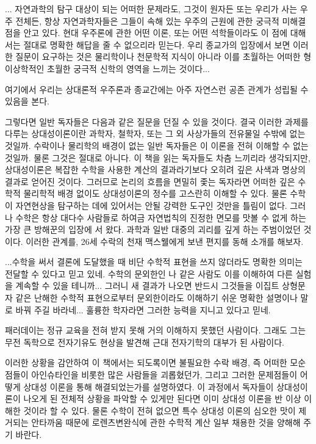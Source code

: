 \beginemph
... 자연과학의 탐구 대상이 되는 어떠한 문제라도, 그것이 원자든 또는 우리가 사는 우주
전체든, 항상 자연과학자들은 그들이 속해 있는 우주의 근원에 관한 궁극적 미해결 점을 안고
있다. 현대 우주론에 관한 어떤 이론, 또는 어떤 석학들이라도 이 점에 대해서는 절대로 명확한
해답을 줄 수 없으리라 믿는다. 우리 종교가의 입장에서 보면 이러한 질문이 요구하는 것은
물리학이나 천문학적 지식이 아니라 이를 초월하는 어떠한 형이상학적인 초월한 궁극적 신학의
영역을 느끼는 것이다...
\endemph

여기에서 우리는 상대론적 우주론과 종교간에는 아주 자연스런 공존 관계가 성립될 수 있음을
본다.

그렇다면 일반 독자들은 다음과 같은 질문을 던질 수 있을 것이다. 결국 이러한 과제를 다루는
상대성이론이란 과학자, 철학자, 또는 그 외 사상가들의 전유물일 수밖에 없는 것일까. 수락이나
물리학의 배경이 없는 일반 독자들은 이 이론을 전혀 이해할 수 없는 것일까. 물론 그것은
절대로 아니다. 이 책을 읽는 독자들도 차츰 느끼리라 생각되지만, 상대성이론은 복잡한 수학을
사용한 계산의 결과라기보다 오히려 깊은 사색과 명상의 결과로 얻어진 것이다. 그러므로
논리의 흐름을 면밀히 좇는 독자라면 어떠한 깊은 수학적 물리학적 배경 없이도 상대성이론의
정수를 고스란히 이해할 수 있다. 물론 수학이 자연현상을 탐구하는 데에 있어서는 안될 강력한
도구인 것만을 틀림이 없다. 그러나 수학은 항상 대다수 사람들로 하여금 자연법칙의 진정한
면모를 맛볼 수 없게 하는 가장 큰 방해꾼의 입장에 서 왔다. 과학과 일반 대중의 괴리를 깊게
하는 주범이었던 것이다. 이러한 관계를, 26세 수락의 천재 맥스웰에게 보낸 편지를 동해 소개를
해보자.

\beginemph
...수학을 써서 결론에 도달했을 때 비단 수학적 표현을 쓰지 않더라도 명확한 의미는 전달할
수 있다고 믿고 있네. 수학의 문외한인 나 같은 사람도 이를 이해하여 다른 실험을 계속할 수
있을 테니까... 그러니 새 결과가 나오면 반드시 그것들을 이집트 상형문자 같은 난해한 수학적
표현으로부터 문외한이라도 이해하기 쉬운 명확한 설명이나 말로 바꿔 주길 바라네... 훌륭한
학자라면 그러한 능력을  지니고 있다고 믿네.
\endemph

패러데이는 정규 교육을 전혀 받지 못해 거의 이해하지 못했던 사람이다. 그래도 그는
무전 독학으로 전자기유도 현상을 발견해 근대 전자기학의 대부가 된 사람이다.

이러한 상황을 감안하여 이 책에서는 되도록이면 불필요한 수락 배경, 즉 어떠한 모순 점들이
아인슈타인을 비롯한 많은 사람들을 괴롭혔던가, 그리고 그러한 문제점들이 어떻게 상대성
이론을 통해 해결되었는가를 설명하였다. 이 과정에서 독자들이 상대성이론이 나오게 된 전체적
상황을 파악할 수 있게만 된다면 이미 상대성 이론을 반 이상 이해한 것이라 할 수 있다. 물론
수학이 전혀 없으면 특수 상대성 이론의 심오한 맛이 제거되는  안타까움 때문에 로렌츠변완식에
관한 수학적 계산  일부 채용한 것을 양해해 주기 바란다.

